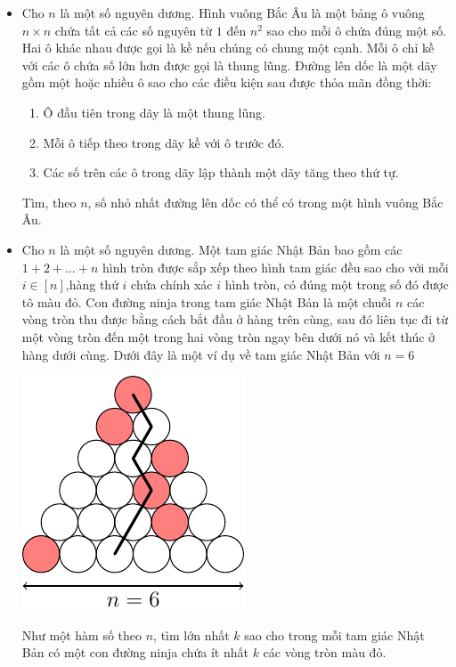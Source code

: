 \documentclass[11pt]{scrartcl}
\begin{document}
\begin{itemize}[label=, leftmargin=0em, itemsep=0.5em]
    \item \begin{btvn} Cho $n$ là một số nguyên dương. Hình vuông Bắc Âu là một bảng ô vuông $n \times n$ chứa tất cả các số nguyên từ $1$ đến $n^2$ sao cho mỗi ô chứa đúng một số. Hai ô khác nhau được gọi là kề nếu chúng có chung một cạnh. Mỗi ô chỉ kề với các ô chứa số lớn hơn được gọi là thung lũng. Đường lên dốc là một dãy gồm một hoặc nhiều ô sao cho các điều kiện sau được thỏa mãn đồng thời:
    \begin{enumerate}
        \item Ô đầu tiên trong dãy là một thung lũng.
        \item Mỗi ô tiếp theo trong dãy kề với ô trước đó.
        \item Các số trên các ô trong dãy lập thành một dãy tăng theo thứ tự.
    \end{enumerate}
    Tìm, theo $n$, số nhỏ nhất đường lên dốc có thể có trong một hình vuông Bắc Âu.
    \end{btvn}
    \item \begin{btvn}
        Cho $n$ là một số nguyên dương. Một tam giác Nhật Bản bao gồm các $1 + 2 + \dots + n$ hình tròn được sắp xếp theo hình tam giác đều sao cho với mỗi $i \in [n]$,hàng thứ $i$ chứa chính xác $i$ hình tròn, có đúng một trong số đó được tô màu đỏ. Con đường ninja trong tam giác Nhật Bản là một chuỗi $n$ các vòng tròn thu được bằng cách bắt đầu ở hàng trên cùng, sau đó liên tục đi từ một vòng tròn đến một trong hai vòng tròn ngay bên dưới nó và kết thúc ở hàng dưới cùng. Dưới đây là một ví dụ về tam giác Nhật Bản với $n = 6$
        \begin{center}
            \includegraphics[scale=1]{Image/IMO2023.pdf}
        \end{center}
  Như một hàm số theo $n$, tìm lớn nhất $k$ sao cho trong mỗi tam giác Nhật Bản có một con đường ninja chứa ít nhất $k$ các vòng tròn màu đỏ.
    \end{btvn}

\end{itemize}
\end{document}

